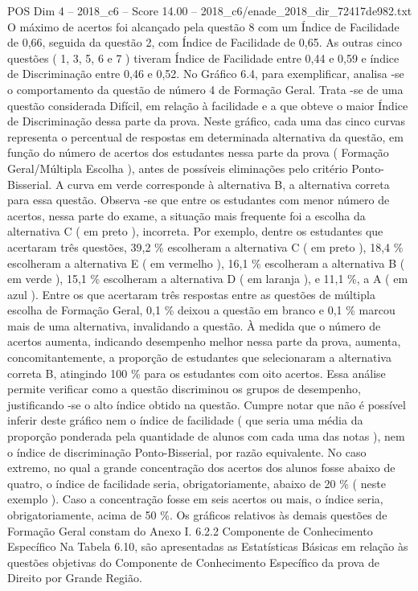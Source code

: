 \begin{textsample}{POS Dim 4 – 2018\_c6 – Score 14.00 – 2018\_c6/enade\_2018\_dir\_72417de982.txt}
O máximo de acertos foi alcançado pela questão 8 com um Índice de Facilidade de 0,66, seguida da questão 2, com Índice de Facilidade de 0,65.
As outras cinco questões ( 1, 3, 5, 6 e 7 ) tiveram Índice de Facilidade entre 0,44 e 0,59 e índice de Discriminação entre 0,46 e 0,52.
No Gráfico 6.4, para exemplificar, analisa -se o comportamento da questão de número 4 de Formação Geral.
Trata -se de uma questão considerada Difícil, em relação à facilidade e a que obteve o maior Índice de Discriminação dessa parte da prova.
Neste gráfico, cada uma das cinco curvas representa o percentual de respostas em determinada alternativa da questão, em função do número de acertos dos estudantes nessa parte da prova ( Formação Geral/Múltipla Escolha ), antes de possíveis eliminações pelo critério Ponto-Bisserial.
A curva em verde corresponde à alternativa B, a alternativa correta para essa questão.
Observa -se que entre os estudantes com menor número de acertos, nessa parte do exame, a situação mais frequente foi a escolha da alternativa C ( em preto ), incorreta.
Por exemplo, dentre os estudantes que acertaram três questões, 39,2 \% escolheram a alternativa C ( em preto ), 18,4 \% escolheram a alternativa E ( em vermelho ), 16,1 \% escolheram a alternativa B ( em verde ), 15,1 \% escolheram a alternativa D ( em laranja ), e 11,1 \%, a A ( em azul ).
Entre os que acertaram três respostas entre as questões de múltipla escolha de Formação Geral, 0,1 \% deixou a questão em branco e 0,1 \% marcou mais de uma alternativa, invalidando a questão.
À medida que o número de acertos aumenta, indicando desempenho melhor nessa parte da prova, aumenta, concomitantemente, a proporção de estudantes que selecionaram a alternativa correta B, atingindo 100 \% para os estudantes com oito acertos.
Essa análise permite verificar como a questão discriminou os grupos de desempenho, justificando -se o alto índice obtido na questão.
Cumpre notar que não é possível inferir deste gráfico nem o índice de facilidade ( que seria uma média da proporção ponderada pela quantidade de alunos com cada uma das notas ), nem o índice de discriminação Ponto-Bisserial, por razão equivalente.
No caso extremo, no qual a grande concentração dos acertos dos alunos fosse abaixo de quatro, o índice de facilidade seria, obrigatoriamente, abaixo de 20 \% ( neste exemplo ).
Caso a concentração fosse em seis acertos ou mais, o índice seria, obrigatoriamente, acima de 50 \%.
Os gráficos relativos às demais questões de Formação Geral constam do Anexo I. 6.2.2 Componente de Conhecimento Específico Na Tabela 6.10, são apresentadas as Estatísticas Básicas em relação às questões objetivas do Componente de Conhecimento Específico da prova de Direito por Grande Região.

\end{textsample}
